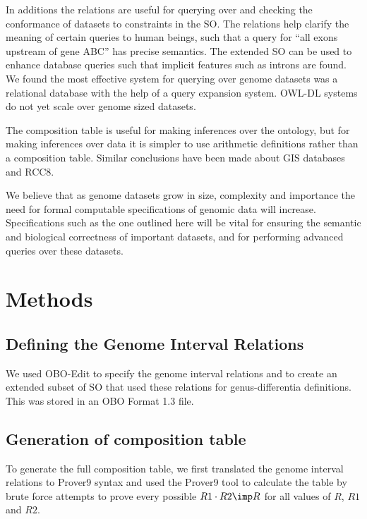\documentclass{article}
\begin{document}
In additions the relations are useful for querying over and checking
the conformance of datasets to constraints in the SO. The relations
help clarify the meaning of certain queries to human beings, such that
a query for ``all exons upstream of gene ABC'' has precise
semantics. The extended SO can be used to enhance database queries
such that implicit features such as introns are found.
We found the most effective system for querying over genome datasets
was a relational database with the help of a query expansion
system. OWL-DL systems do not yet scale over genome sized datasets.

The composition table is useful for making inferences over the
ontology, but for making inferences over data it is simpler to
use arithmetic definitions rather than a composition table. Similar
conclusions have been made about GIS databases and RCC8\cite{Goodwin}.

We believe that as genome datasets grow in size, complexity and
importance the need for formal computable specifications of genomic
data will increase. Specifications such as the one outlined here will
be vital for ensuring the semantic and biological correctness of
important datasets, and for performing advanced queries over these
datasets.

\section{Methods}

\subsection{Defining the Genome Interval Relations}

We used OBO-Edit\cite{Day-Richter2007} to specify the genome interval
relations and to create an extended subset of SO that used these
relations for genus-differentia definitions. This was stored in an OBO
Format 1.3 file.

\subsection{Generation of composition table}

To generate the full composition table, we first translated the genome
interval relations to Prover9 syntax and used the Prover9 tool to
calculate the table by brute force attempts to prove every possible
$R1 \cdot R2 \imp R$ for all values of $R$, $R1$ and $R2$.
\end{document}
